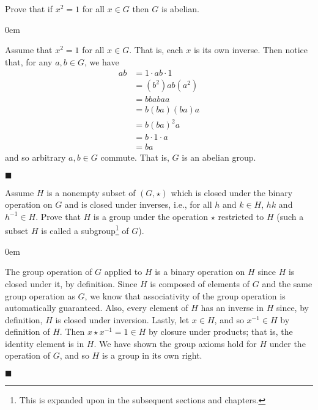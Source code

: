 \documentclass[12pt]{article}
\renewcommand{\qed}{\hfill$\blacksquare$}
\renewenvironment{proof}{\begin{addmargin}[1em]{0em}\begin{newproof}}{\end{newproof}\end{addmargin}\qed}
\newenvironment{problem}[2][Exercise]{\begin{trivlist}
\item[\hskip \labelsep {\bfseries #1}\hskip \labelsep {\bfseries #2.}]}{\end{trivlist}}
\begin{document}
\begin{problem}{1.1.25}
Prove that if $x^2=1$ for all $x\in G$ then $G$ is abelian.
\end{problem}
\begin{proof}
Assume that $x^2=1$ for all $x\in G$. That is, each $x$ is its own inverse. Then notice that, for any $a,b\in G$, we have
\begin{equation*}
    \begin{split}
        ab & = 1\cdot ab \cdot 1 \\
        & = \left(b^2\right) ab \left(a^2\right) \\
        & = bbabaa \\
        & = b\left(ba\right)\left(ba\right)a \\
        & = b\left(ba\right)^2 a \\
        & = b\cdot 1 \cdot a \\
        & = ba
    \end{split}
\end{equation*}
and so arbitrary $a,b\in G$ commute. That is, $G$ is an abelian group.
\end{proof}


\begin{problem}{1.1.26}
Assume $H$ is a nonempty subset of $\left(G,\star\right)$ which is closed under the binary operation on $G$ and is closed under inverses, i.e., for all $h$ and $k\in H$, $hk$ and $h^{-1}\in H$. Prove that $H$ is a group under the operation $\star$ restricted to $H$ (such a subset $H$ is called a subgroup\footnote{This is expanded upon in the subsequent sections and chapters.} of $G$).
\end{problem}
\begin{proof}
The group operation of $G$ applied to $H$ is a binary operation on $H$ since $H$ is closed under it, by definition. Since $H$ is composed of elements of $G$ and the same group operation as $G$, we know that associativity of the group operation is automatically guaranteed. Also, every element of $H$ has an inverse in $H$ since, by definition, $H$ is closed under inversion. Lastly, let $x\in H$, and so $x^{-1}\in H$ by definition of $H$. Then $x\star x^{-1}=1 \in H$ by closure under products; that is, the identity element is in $H$. We have shown the group axioms hold for $H$ under the operation of $G$, and so $H$ is a group in its own right.
\end{proof}
\end{document}
